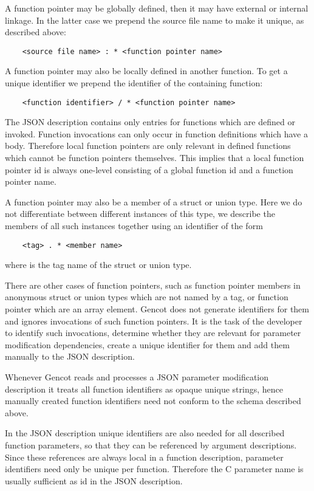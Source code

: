 A function pointer may be globally defined, then it may have external or internal linkage. In the latter case we
prepend the source file name to make it unique, as described above:
\begin{verbatim}
    <source file name> : * <function pointer name>
\end{verbatim}

A function pointer may also be locally defined in another function. To get a unique identifier we prepend the 
identifier of the containing function:
\begin{verbatim}
    <function identifier> / * <function pointer name>
\end{verbatim}
The JSON description contains only entries for functions which are defined or invoked. Function invocations can only
occur in function definitions which have a body. Therefore local function pointers are only relevant in defined
functions which cannot be function pointers themselves. This implies that a local function pointer id is always 
one-level consisting of a global function id and a function pointer name.

A function pointer may also be a member of a struct or union type. Here we do not differentiate between different instances 
of this type, we describe the members of all such instances together using an identifier of the form
\begin{verbatim}
    <tag> . * <member name>
\end{verbatim}
where  is the tag name of the struct or union type. 

There are other cases of function pointers, such as function pointer members in anonymous struct or union 
types which are not named by a tag, or function pointer which are an array element. Gencot does not generate identifiers
for them and ignores invocations of such function pointers. It is the task of the developer to identify such invocations,
determine whether they are relevant for parameter modification dependencies, create a unique identifier for them and
add them manually to the JSON description. 

Whenever Gencot reads and processes a JSON parameter modification description it treats all function identifiers as
opaque unique strings, hence manually created function identifiers need not conform to the schema described above.

In the JSON description unique identifiers are also needed for all described function parameters, so that they can 
be referenced by argument descriptions. Since these references are always local in a function description, parameter
identifiers need only be unique per function. Therefore the C parameter name is usually sufficient as id in the 
JSON description.

